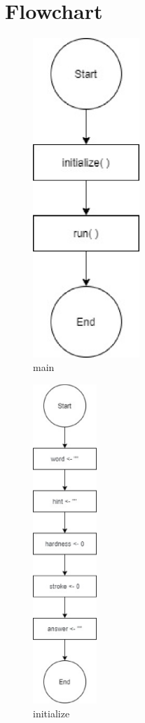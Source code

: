 \documentclass{article}
\begin{document}
    \section{Flowchart}
        \begin{figure}[htbp]
            \centering
            \includegraphics[height = 12cm]{flowchart/main.eps}
            \caption{main}
        \end{figure}

        \begin{figure}[htbp]
            \centering
            \includegraphics[height = 12cm]{flowchart/initialize.eps}
            \caption{initialize}
        \end{figure}
                    
\end{document}

